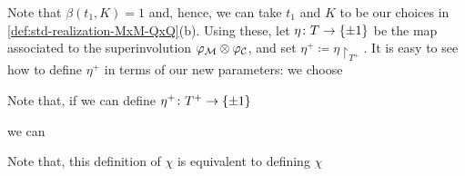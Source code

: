 Note that $\beta(t_1, K) = 1$ and, hence, we can take $t_1$ and $K$ to be our choices in \cref{def:std-realization-MxM-QxQ}(b). 
Using these, let $\eta \colon T \to \{ \pm 1 \}$ be the map associated to the superinvolution $\varphi_{\mathcal M} \otimes \varphi_{\mathcal C}$, and set $\eta^+ \coloneqq \eta\restriction_{T^+}$. 
It is easy to see how to define $\eta^+$ in terms of our new parameters: we choose 



Note that, if  we can define $\eta^+\colon T^+ \to \{ \pm 1 \}$




we can

Note that, this definition of $\chi$ is equivalent to defining $\chi$